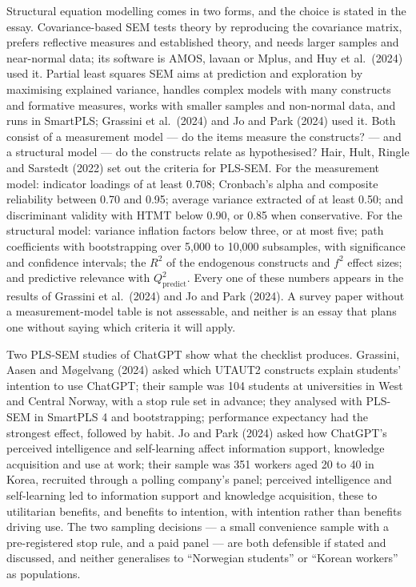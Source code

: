 \documentclass[11pt,a4paper,british,twoside=false,headings=small,chapterprefix=false,numbers=noenddot]{scrbook}
\begin{document}
Structural equation modelling comes in two forms, and the choice is stated in the essay. Covariance-based SEM tests theory by reproducing the covariance matrix, prefers reflective measures and established theory, and needs larger samples and near-normal data; its software is AMOS, lavaan or Mplus, and Huy et al.\ (2024) used it. Partial least squares SEM aims at prediction and exploration by maximising explained variance, handles complex models with many constructs and formative measures, works with smaller samples and non-normal data, and runs in SmartPLS; Grassini et al.\ (2024) and Jo and Park (2024) used it. Both consist of a measurement model --- do the items measure the constructs? --- and a structural model --- do the constructs relate as hypothesised? Hair, Hult, Ringle and Sarstedt (2022) set out the criteria for PLS-SEM. For the measurement model: indicator loadings of at least 0.708; Cronbach's alpha and composite reliability between 0.70 and 0.95; average variance extracted of at least 0.50; and discriminant validity with HTMT below 0.90, or 0.85 when conservative. For the structural model: variance inflation factors below three, or at most five; path coefficients with bootstrapping over 5,000 to 10,000 subsamples, with significance and confidence intervals; the $R^2$ of the endogenous constructs and $f^2$ effect sizes; and predictive relevance with $Q^2_\text{predict}$. Every one of these numbers appears in the results of Grassini et al.\ (2024) and Jo and Park (2024). A survey paper without a measurement-model table is not assessable, and neither is an essay that plans one without saying which criteria it will apply.

Two PLS-SEM studies of ChatGPT show what the checklist produces. Grassini, Aasen and Møgelvang (2024) asked which UTAUT2 constructs explain students' intention to use ChatGPT; their sample was 104 students at universities in West and Central Norway, with a stop rule set in advance; they analysed with PLS-SEM in SmartPLS 4 and bootstrapping; performance expectancy had the strongest effect, followed by habit. Jo and Park (2024) asked how ChatGPT's perceived intelligence and self-learning affect information support, knowledge acquisition and use at work; their sample was 351 workers aged 20 to 40 in Korea, recruited through a polling company's panel; perceived intelligence and self-learning led to information support and knowledge acquisition, these to utilitarian benefits, and benefits to intention, with intention rather than benefits driving use. The two sampling decisions --- a small convenience sample with a pre-registered stop rule, and a paid panel --- are both defensible if stated and discussed, and neither generalises to ``Norwegian students'' or ``Korean workers'' as populations.
\end{document}
